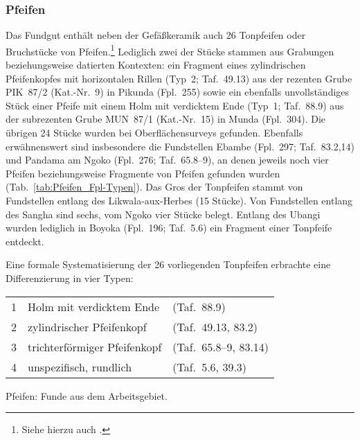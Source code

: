 \subsubsection{Pfeifen}\label{sec:Pfeifen}

Das Fundgut enthält neben der Gefäßkeramik auch 26 Tonpfeifen oder Bruchstücke von Pfeifen.\footnote{Siehe hierzu auch \parencites{Shaw.1960}{Philips.1983}{Cremer.2004}.} Lediglich zwei der Stücke stammen aus Grabungen beziehungsweise datierten Kontexten: ein Fragment eines zylindrischen Pfeifenkopfes mit horizontalen Rillen (Typ~2; Taf.~49.13) aus der rezenten Grube PIK~87/2 (Kat.-Nr.~9) in Pikunda (Fpl.~255) sowie ein ebenfalls unvollständiges Stück einer Pfeife mit einem Holm mit verdicktem Ende (Typ~1; Taf.~88.9) aus der subrezenten Grube MUN~87/1 (Kat.-Nr.~15) in Munda (Fpl.~304). Die übrigen 24 Stücke wurden bei Oberflächensurveys gefunden. Ebenfalls erwähnenswert sind insbesondere die Fundstellen Ebambe (Fpl.~297; Taf.~83.2,14) und Pandama am Ngoko (Fpl.~276; Taf.~65.8--9), an denen jeweils noch vier Pfeifen beziehungsweise Fragmente von Pfeifen gefunden wurden (Tab.~\ref{tab:Pfeifen_Fpl-Typen}). Das Gros der Tonpfeifen stammt von Fundstellen entlang des Likwala-aux-Herbes (15 Stücke). Von Fundstellen entlang des Sangha sind sechs, vom Ngoko vier Stücke belegt. Entlang des Ubangi wurden lediglich in Boyoka (Fpl.~196; Taf.~5.6) ein Fragment einer Tonpfeife entdeckt.

Eine formale Systematisierung der 26 vorliegenden Tonpfeifen erbrachte eine Differenzierung in vier Typen:
\setlength\LTleft{0pt}
\begin{longtable}{@{}lll@{}}
1 & Holm mit verdicktem Ende & (Taf.~88.9) \\
2 & zylindrischer Pfeifenkopf & (Taf.~49.13, 83.2) \\ 
3 & trichterförmiger Pfeifenkopf & (Taf.~65.8--9, 83.14) \\
4 & unspezifisch, rundlich & (Taf.~5.6, 39.3) \\
\end{longtable}
\addtocounter{table}{-1}

\begin{table*}[tb]
	\centering
	{\small }
	\caption{Pfeifen: Funde aus dem Arbeitsgebiet.}
	\label{tab:Pfeifen_Fpl-Typen}
\end{table*}

